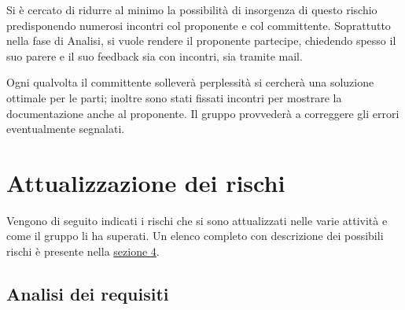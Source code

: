 \documentclass[a4paper, titlepage]{article}
\begin{document}
	Si è cercato di ridurre al minimo la possibilità di insorgenza di questo rischio predisponendo numerosi incontri col proponente e col committente. Soprattutto nella fase di Analisi, si vuole rendere il proponente partecipe, chiedendo spesso il suo parere e il suo feedback sia con incontri, sia tramite mail.
	
	Ogni qualvolta il committente solleverà perplessità si cercherà una soluzione ottimale per le parti; inoltre sono stati fissati incontri per mostrare la documentazione anche al proponente. Il gruppo provvederà a correggere gli errori eventualmente segnalati.
	
		\section{Attualizzazione dei rischi} \label{Attualizzazione dei rischi}
		Vengono di seguito indicati i rischi che si sono attualizzati nelle varie attività e come il gruppo li ha superati. Un elenco completo con descrizione dei possibili rischi è presente nella \hyperref[Analisi dei rischi]{sezione 4}.
		
		\subsection{Analisi dei requisiti}
		
\end{document}
